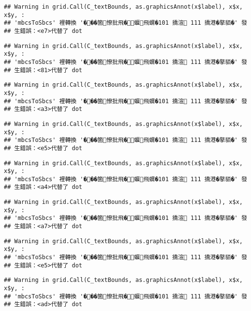 \documentclass[
]{article}
\begin{document}
\begin{verbatim}
## Warning in grid.Call(C_textBounds, as.graphicsAnnot(x$label), x$x, x$y, :
## 'mbcsToSbcs' 裡轉換 '���箇憭批飛�蝘飛蝟�101 撟渲 111 撟港�摮貊�' 發
## 生錯誤：<e7>代替了 dot
\end{verbatim}

\begin{verbatim}
## Warning in grid.Call(C_textBounds, as.graphicsAnnot(x$label), x$x, x$y, :
## 'mbcsToSbcs' 裡轉換 '���箇憭批飛�蝘飛蝟�101 撟渲 111 撟港�摮貊�' 發
## 生錯誤：<81>代替了 dot
\end{verbatim}

\begin{verbatim}
## Warning in grid.Call(C_textBounds, as.graphicsAnnot(x$label), x$x, x$y, :
## 'mbcsToSbcs' 裡轉換 '���箇憭批飛�蝘飛蝟�101 撟渲 111 撟港�摮貊�' 發
## 生錯誤：<a3>代替了 dot
\end{verbatim}

\begin{verbatim}
## Warning in grid.Call(C_textBounds, as.graphicsAnnot(x$label), x$x, x$y, :
## 'mbcsToSbcs' 裡轉換 '���箇憭批飛�蝘飛蝟�101 撟渲 111 撟港�摮貊�' 發
## 生錯誤：<e5>代替了 dot
\end{verbatim}

\begin{verbatim}
## Warning in grid.Call(C_textBounds, as.graphicsAnnot(x$label), x$x, x$y, :
## 'mbcsToSbcs' 裡轉換 '���箇憭批飛�蝘飛蝟�101 撟渲 111 撟港�摮貊�' 發
## 生錯誤：<a4>代替了 dot
\end{verbatim}

\begin{verbatim}
## Warning in grid.Call(C_textBounds, as.graphicsAnnot(x$label), x$x, x$y, :
## 'mbcsToSbcs' 裡轉換 '���箇憭批飛�蝘飛蝟�101 撟渲 111 撟港�摮貊�' 發
## 生錯誤：<a7>代替了 dot
\end{verbatim}

\begin{verbatim}
## Warning in grid.Call(C_textBounds, as.graphicsAnnot(x$label), x$x, x$y, :
## 'mbcsToSbcs' 裡轉換 '���箇憭批飛�蝘飛蝟�101 撟渲 111 撟港�摮貊�' 發
## 生錯誤：<e5>代替了 dot
\end{verbatim}

\begin{verbatim}
## Warning in grid.Call(C_textBounds, as.graphicsAnnot(x$label), x$x, x$y, :
## 'mbcsToSbcs' 裡轉換 '���箇憭批飛�蝘飛蝟�101 撟渲 111 撟港�摮貊�' 發
## 生錯誤：<ad>代替了 dot
\end{verbatim}
\end{document}
